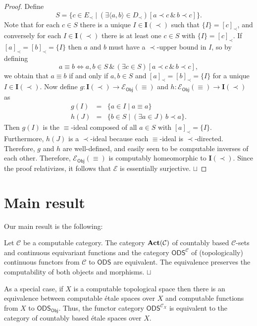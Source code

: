 \documentclass[envcountsame]{llncs}
\def\squareforqed{\hbox{\rlap{$\sqcap$}$\sqcup$}}
\def\qed{\ifmmode\squareforqed\else{\unskip\nobreak\hfil
\penalty50\hskip1em\null\nobreak\hfil\squareforqed
\parfillskip=0pt\finalhyphendemerits=0\endgraf}\fi}
\def\calC{{\mathcal{C}}}
\def\calE{{\mathcal{E}}}
\def\I#1{{{\mathrm{\mathbf I}}(#1)}}
\newcommand{\cntSets}{{\mathsf{ODS}}}
\newcommand{\Obj}{\mathsf{Obj}}
\def\act{{\mathrm{\bold{Act}}}}
\begin{document}
\begin{proof}
Define
\[S = \{ c\in E_\prec \mid (\exists \langle a,b\rangle\in D_\prec)[a\prec c\,\&\, b\prec c]\}.\]  
Note that for each $c\in S$ there is a unique $I\in\I{\prec}$ such that $\{I\}=[c]_\prec$, and conversely for each $I\in\I{\prec}$ there is at least one $c\in S$ with $\{I\}=[c]_\prec$. If $[a]_\prec = [b]_\prec = \{I\}$ then $a$ and $b$ must have a $\prec$-upper bound in $I$, so by defining
\[a \equiv b \iff a,b\in S \,\&\, (\exists c\in S)[a\prec c\,\&\, b\prec c],\]
we obtain that $a\equiv b$ if and only if $a,b\in S$ and $[a]_\prec = [b]_\prec=\{I\}$ for a unique $I\in\I{\prec}$. Now define $g\colon \I{\prec}\to \calE_\Obj(\equiv)$ and $h\colon \calE_\Obj(\equiv)\to\I{\prec}$ as
\begin{eqnarray*}
g(I) &=& \{ a\in I \mid a \equiv a\}\\
h(J) &=& \{ b\in S\mid (\exists a\in J)\,b\prec a \}.
\end{eqnarray*}
Then $g(I)$ is the $\equiv$-ideal composed of all $a\in S$ with $[a]_\prec = \{I\}$. Furthermore, $h(J)$ is a $\prec$-ideal because each $\equiv$-ideal is $\prec$-directed. Therefore, $g$ and $h$ are well-defined, and easily seen to be computable inverses of each other. Therefore, $\calE_\Obj(\equiv)$ is computably homeomorphic to $\I{\prec}$. Since the proof relativizes, it follows that $\calE$ is essentially surjective.
\qed
\end{proof}


\section{Main result}


Our main result is the following:

\begin{theorem}
Let $\calC$ be a computable category. The category $\act(\calC)$ of countably based $\calC$-sets and continuous equivariant functions and the category $\cntSets^\calC$ of (topologically) continuous functors from $\calC$ to $\cntSets$ are equivalent. The equivalence preserves the computability of both objects and morphisms.
\qed
\end{theorem}

As a special case, if $X$ is a computable topological space then there is an equivalence between computable \'{e}tale spaces over $X$ and computable functions from $X$ to $\cntSets_\Obj$.  Thus, the functor category $\cntSets^{\calC_X}$ is equivalent to the category of countably based \'{e}tale spaces over $X$. 
\end{document}
